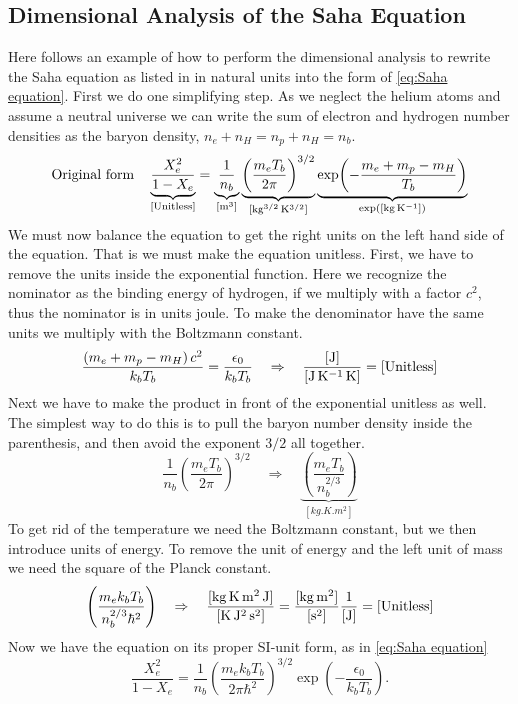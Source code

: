 \documentclass[10pt,a4paper]{article}
\begin{document}
\begin{appendices}
    \section{Dimensional Analysis of the Saha Equation}
    \label{asec:Dimensional analysis}
    Here follows an example of how to perform the dimensional analysis to rewrite the Saha equation as listed in \cite[p. 70]{Dodelson} in natural units into the form of \cref{eq:Saha equation}. First we do one simplifying step. As we neglect the helium atoms and assume a neutral universe we can write the sum of electron and hydrogen number densities as the baryon density, $n_e + n_H = n_p + n_H = n_b$.
    \begin{equation*}
        \text{Original form} \quad 
        \underbrace{\frac{X_e^2}{1-X_e}}_{\rm{[Unitless]}} = \underbrace{\frac{1}{n_b}}_{[\si{m^3}]}\underbrace{\left(\frac{m_e T_b}{2\pi}\right)^{3/2}}_{[\si{kg^{3/2}.K^{3/2}}]} \underbrace{\exp(-\frac{m_e+m_p-m_H}{T_b})}_{\exp([\si{kg.K^{-1}}])}
    \end{equation*}
    We must now balance the equation to get the right units on the left hand side of the equation. That is we must make the equation unitless. First, we have to remove the units inside the exponential function. Here we recognize the nominator as the binding energy of hydrogen, if we multiply with a factor $c^2$, thus the nominator is in units joule. To make the denominator have the same units we multiply with the Boltzmann constant.
    \begin{equation*}
        \frac{\left(m_e+m_p-m_H\right)c^2}{k_b T_b} = \frac{\epsilon_0}{k_b T_b} \quad \Rightarrow \quad \frac{[\si{J}]}{[\si{J.K^{-1}.K}]} = [\rm{Unitless}]
    \end{equation*}
    Next we have to make the product in front of the exponential unitless as well. The simplest way to do this is to pull the baryon number density inside the parenthesis, and then avoid the exponent $3/2$ all together.
    \begin{equation*}
        \frac{1}{n_b}\left(\frac{m_eT_b}{2\pi}\right)^{3/2} \quad \Rightarrow \quad \underbrace{\left(\frac{m_e T_b}{n_b^{2/3}}\right)}_{[\si{kg.K.m^2}]}
    \end{equation*}
    To get rid of the temperature we need the Boltzmann constant, but we then introduce units of energy. To remove the unit of energy and the left unit of mass we need the square of the Planck constant.
    \begin{equation*}
        \left(\frac{m_e k_b T_b}{n_b^{2/3}\hbar^2}\right) \quad \Rightarrow \quad \frac{[\si{kg.K.m^2.J}]}{[\si{K.J^2.s^2}]} = \frac{[\si{kg.m^2}]}{[\si{s^2}]}\frac{1}{[\si{J}]} = [\rm{Unitless}]
    \end{equation*}
    Now we have the equation on its proper SI-unit form, as in \cref{eq:Saha equation}
    \begin{equation*}
        \frac{X_e^2}{1-X_e} = \frac{1}{n_b}\left(\frac{m_e k_b T_b}{2\pi \hbar^2}\right)^{3/2} \exp(-\frac{\epsilon_0}{k_b T_b}).
    \end{equation*}

\end{appendices}
\end{document}
